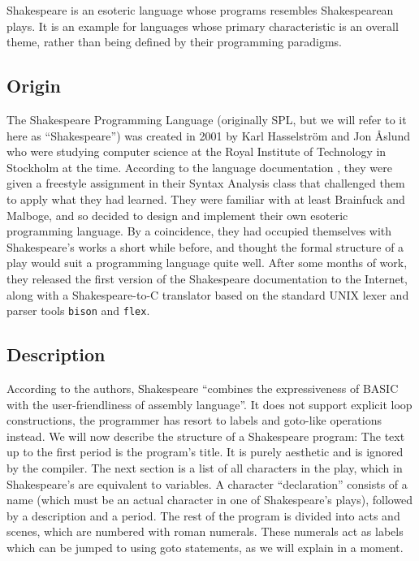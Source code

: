 Shakespeare is an esoteric language whose programs resembles Shakespearean plays. It is an example for languages whose primary characteristic is an overall theme, rather than being defined by their programming paradigms.

\subsection{Origin}

The Shakespeare Programming Language (originally SPL, but we will refer to it here as “Shakespeare”) was created in 2001 by Karl Hasselström and Jon Åslund who were studying computer science at the Royal Institute of Technology in Stockholm at the time. According to the language documentation \cite{hasselstrom2001shakespeare}, they were given a freestyle assignment in their Syntax Analysis class that challenged them to apply what they had learned. They were familiar with at least Brainfuck and Malboge, and so decided to design and implement their own esoteric programming language. By a coincidence, they had occupied themselves with Shakespeare's works a short while before, and thought the formal structure of a play would suit a programming language quite well. After some months of work, they released the first version of the Shakespeare documentation to the Internet, along with a Shakespeare-to-C translator based on the standard UNIX lexer and parser tools \texttt{bison} and \texttt{flex}.

\subsection{Description}

According to the authors, Shakespeare “combines the expressiveness of BASIC with the user-friendliness of assembly language”. It does not support explicit loop constructions, the programmer has resort to labels and goto-like operations instead. We will now describe the structure of a Shakespeare program:
The text up to the first period is the program's title. It is purely aesthetic and is ignored by the compiler. The next section is a list of all characters in the play, which in Shakespeare's are equivalent to variables. A character “declaration” consists of a name (which must be an actual character in one of Shakespeare's plays), followed by a description and a period. The rest of the program is divided into acts and scenes, which are numbered with roman numerals. These numerals act as labels which can be jumped to using goto statements, as we will explain in a moment.

